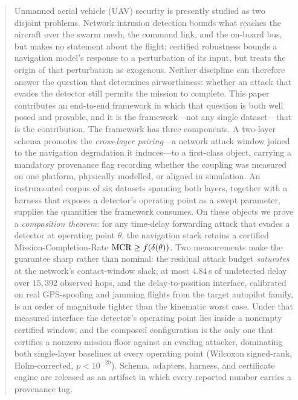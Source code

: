 \begin{abstract}
Unmanned aerial vehicle (UAV) security is presently studied as two disjoint
problems. Network intrusion detection bounds what reaches the aircraft over the
swarm mesh, the command link, and the on-board bus, but makes no statement about
the flight; certified robustness bounds a navigation model's response to a
perturbation of its input, but treats the origin of that perturbation as
exogenous. Neither discipline can therefore answer the question that determines
airworthiness: whether an attack that evades the detector still permits the
mission to complete. This paper contributes an end-to-end framework in which
that question is both well posed and provable, and it is the framework---not any
single dataset---that is the contribution. The framework has three components.
A two-layer schema promotes the \emph{cross-layer pairing}---a network attack
window joined to the navigation degradation it induces---to a first-class
object, carrying a mandatory provenance flag recording whether the coupling was
measured on one platform, physically modelled, or aligned in simulation. An
instrumented corpus of six datasets spanning both layers, together with a
harness that exposes a detector's operating point as a swept parameter, supplies
the quantities the framework consumes. On these objects we prove a
\emph{composition theorem}: for any time-delay forwarding attack that evades a
detector at operating point $\theta$, the navigation stack retains a certified
Mission-Completion-Rate $\MCR\ge f(\delta(\theta))$. Two measurements make the
guarantee sharp rather than nominal: the residual attack budget \emph{saturates}
at the network's contact-window slack, at most $4.84$\,s of undetected delay
over $15{,}392$ observed hops, and the delay-to-position interface, calibrated
on real GPS-spoofing and jamming flights from the target autopilot family, is an
order of magnitude tighter than the kinematic worst case. Under that measured
interface the detector's operating point lies inside a nonempty certified
window, and the composed configuration is the only one that certifies a nonzero
mission floor against an evading attacker, dominating both single-layer
baselines at every operating point (Wilcoxon signed-rank, Holm-corrected,
$p<10^{-20}$). Schema, adapters, harness, and certificate engine are released as
an artifact in which every reported number carries a provenance tag.
\end{abstract}

